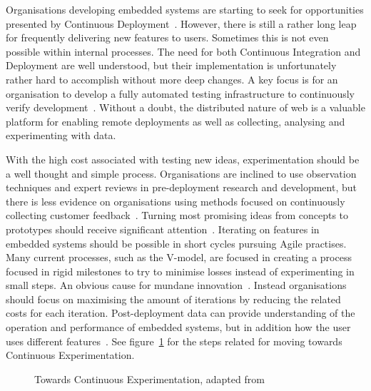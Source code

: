 \documentclass[english]{tktltiki2}
\begin{document}
Organisations developing embedded systems are starting to seek for opportunities presented by Continuous Deployment~\cite{HAB12}. However, there is still a rather long leap for frequently delivering new features to users. Sometimes this is not even possible within internal processes. The need for both Continuous Integration and Deployment are well understood, but their implementation is unfortunately rather hard to accomplish without more deep changes. A key focus is for an organisation to develop a fully automated testing infrastructure to continuously verify development~\cite{HAB12}. Without a doubt, the distributed nature of web is a valuable platform for enabling remote deployments as well as collecting, analysing and experimenting with data.

With the high cost associated with testing new ideas, experimentation should be a well thought and simple process. Organisations are inclined to use observation techniques and expert reviews in pre-deployment research and development, but there is less evidence on organisations using methods focused on continuously collecting customer feedback~\cite{HB14}. Turning most promising ideas from concepts to prototypes should receive significant attention~\cite{BE12}. Iterating on features in embedded systems should be possible in short cycles pursuing Agile practises. Many current processes, such as the V-model, are focused in creating a process focused in rigid milestones to try to minimise losses instead of experimenting in small steps. An obvious cause for mundane innovation~\cite{BE12}. Instead organisations should focus on maximising the amount of iterations by reducing the related costs for each iteration. Post-deployment data can provide understanding of the operation and performance of embedded systems, but in addition how the user uses different features~\cite{BE12, HB14}. See figure~\ref{figure:towards-continuous-experimentation} for the steps related for moving towards Continuous Experimentation.

\begin{figure}[h!]

    \vspace{1cm}
    \centering


    \caption{Towards Continuous Experimentation, adapted from~\cite{HAB12}}
    \label{figure:towards-continuous-experimentation}

    \vspace{1cm}

\end{figure}
\end{document}
